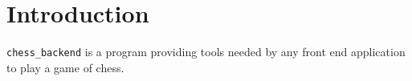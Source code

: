 \section{Introduction}

\texttt{chess\_backend} is a program providing tools needed by any front end application to play a game of chess.
